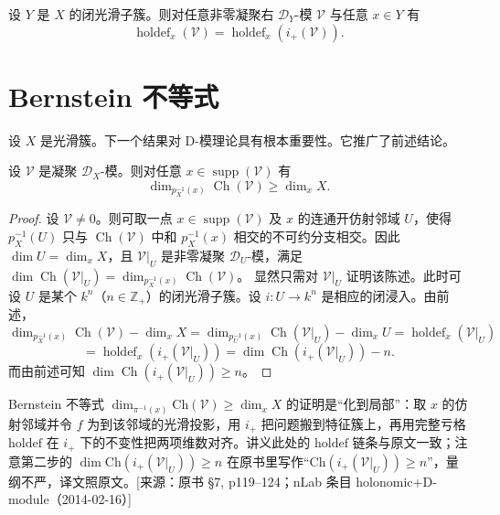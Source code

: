 \begin{corollary}\label{cor:4.6.9}
设 $Y$ 是 $X$ 的闭光滑子簇。则对任意非零凝聚右 $\mathcal{D}_Y$-模 $\mathcal{V}$ 与任意 $x\in Y$ 有
$$\operatorname{holdef}_x(\mathcal{V})=\operatorname{holdef}_x(i_+(\mathcal{V})).$$
\end{corollary}

\section{Bernstein 不等式}

设 $X$ 是光滑簇。下一个结果对 D-模理论具有根本重要性。它推广了前述结论。

\begin{theorem}\label{thm:4.7.1}
设 $\mathcal{V}$ 是凝聚 $\mathcal{D}_X$-模。则对任意 $x\in\operatorname{supp}(\mathcal{V})$ 有
$$\dim_{p_X^{-1}(x)}\operatorname{Ch}(\mathcal{V})\ge\dim_xX.$$
\end{theorem}

\begin{proof}
设 $\mathcal{V}\ne0$。则可取一点 $x\in\operatorname{supp}(\mathcal{V})$ 及 $x$ 的连通开仿射邻域 $U$，使得
$p_X^{-1}(U)$ 只与 $\operatorname{Ch}(\mathcal{V})$ 中和 $p_X^{-1}(x)$ 相交的不可约分支相交。因此
$\dim U=\dim_xX$，且 $\mathcal{V}|_U$ 是非零凝聚 $\mathcal{D}_U$-模，满足
$\dim\operatorname{Ch}(\mathcal{V}|_U)=\dim_{p_X^{-1}(x)}\operatorname{Ch}(\mathcal{V})$。
显然只需对 $\mathcal{V}|_U$ 证明该陈述。此时可设 $U$ 是某个 $k^n$（$n\in\mathbb{Z}_+$）的闭光滑子簇。设
$i:U\to k^n$ 是相应的闭浸入。由前述，
$$\dim_{p_X^{-1}(x)}\operatorname{Ch}(\mathcal{V})-\dim_xX
=\dim_{p_U^{-1}(x)}\operatorname{Ch}(\mathcal{V}|_U)-\dim_xU=\operatorname{holdef}_x(\mathcal{V}|_U)$$
$$=\operatorname{holdef}_x(i_+(\mathcal{V}|_U))=\dim\operatorname{Ch}(i_+(\mathcal{V}|_U))-n.$$
而由前述可知 $\dim\operatorname{Ch}(i_+(\mathcal{V}|_U))\ge n$。
\end{proof}
\begin{annote}
Bernstein 不等式 $\dim_{\pi^{-1}(x)}\mathrm{Ch}(\mathcal V)\ge\dim_x X$ 的证明是“化到局部”：取 $x$ 的仿射邻域并令 $f$ 为到该邻域的光滑投影，用 $i_+$ 把问题搬到特征簇上，再用完整亏格 $\mathrm{holdef}$ 在 $i_+$ 下的不变性把两项维数对齐。讲义此处的 $\mathrm{holdef}$ 链条与原文一致；注意第二步的 $\dim\mathrm{Ch}(i_+(\mathcal V|_U))\ge n$ 在原书里写作“$\mathrm{Ch}(i_+(\mathcal V|_U))\ge n$”，量纲不严，译文照原文。[来源：原书 §7, p119–124；nLab 条目 holonomic+D-module（2014-02-16）]
\end{annote}



